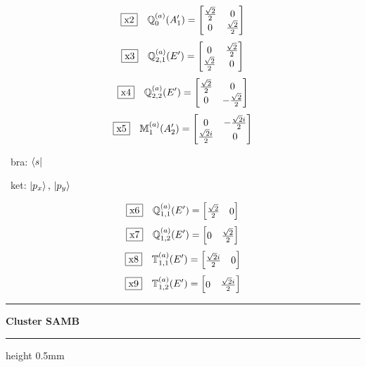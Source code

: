 \documentclass[fleqn,10pt,landscape]{jsarticle}
\begin{document}
\begin{dmath*}
\fbox{x2}\quad \mathbb{Q}_{0}^{(a)}(A_{1}^{\prime})=\begin{bmatrix} \frac{\sqrt{2}}{2} & 0 \\ 0 & \frac{\sqrt{2}}{2} \end{bmatrix}
\end{dmath*}
\begin{dmath*}
\fbox{x3}\quad \mathbb{Q}_{2,1}^{(a)}(E^{\prime})=\begin{bmatrix} 0 & \frac{\sqrt{2}}{2} \\ \frac{\sqrt{2}}{2} & 0 \end{bmatrix}
\end{dmath*}
\begin{dmath*}
\fbox{x4}\quad \mathbb{Q}_{2,2}^{(a)}(E^{\prime})=\begin{bmatrix} \frac{\sqrt{2}}{2} & 0 \\ 0 & - \frac{\sqrt{2}}{2} \end{bmatrix}
\end{dmath*}
\begin{dmath*}
\fbox{x5}\quad \mathbb{M}_{1}^{(a)}(A_{2}^{\prime})=\begin{bmatrix} 0 & - \frac{\sqrt{2} i}{2} \\ \frac{\sqrt{2} i}{2} & 0 \end{bmatrix}
\end{dmath*}
\vspace{5mm}

\noindent\textbullet\, bra: $\bra{s}$

\noindent\textbullet\, ket: $\ket{p_{x}},\, \ket{p_{y}}$

\begin{dmath*}
\fbox{x6}\quad \mathbb{Q}_{1,1}^{(a)}(E^{\prime})=\begin{bmatrix} \frac{\sqrt{2}}{2} & 0 \end{bmatrix}
\end{dmath*}
\begin{dmath*}
\fbox{x7}\quad \mathbb{Q}_{1,2}^{(a)}(E^{\prime})=\begin{bmatrix} 0 & \frac{\sqrt{2}}{2} \end{bmatrix}
\end{dmath*}
\begin{dmath*}
\fbox{x8}\quad \mathbb{T}_{1,1}^{(a)}(E^{\prime})=\begin{bmatrix} \frac{\sqrt{2} i}{2} & 0 \end{bmatrix}
\end{dmath*}
\begin{dmath*}
\fbox{x9}\quad \mathbb{T}_{1,2}^{(a)}(E^{\prime})=\begin{bmatrix} 0 & \frac{\sqrt{2} i}{2} \end{bmatrix}
\end{dmath*}
\vspace{5mm}
\noindent \rule[0.5mm]{5mm}{0.5mm}\hspace{3mm}\textbf{Cluster SAMB}\hspace{3mm}\leaders\hrule height 0.5mm\hfill\kern0pt
\vspace{3mm}
\end{document}
